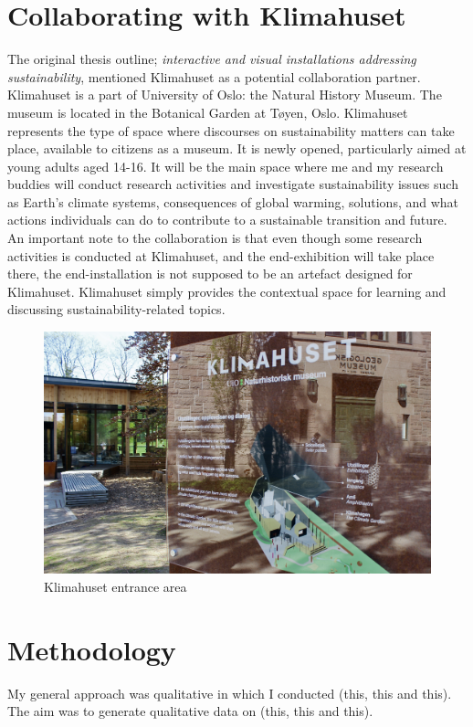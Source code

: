 \section{Collaborating with Klimahuset}
The original thesis outline; \emph{interactive and visual installations addressing sustainability}, mentioned Klimahuset as a potential collaboration partner. Klimahuset is a part of University of Oslo: the Natural History Museum. The museum is located in the Botanical Garden at Tøyen, Oslo. Klimahuset represents the type of space where discourses on sustainability matters can take place, available to citizens as a museum. It is newly opened, particularly aimed at young adults aged 14-16. It will be the main space where me and my research buddies will conduct research activities and investigate sustainability issues such as Earth’s climate systems, consequences of global warming, solutions, and what actions individuals can do to contribute to a sustainable transition and future. An important note to the collaboration is that even though some research activities is conducted at Klimahuset, and the end-exhibition will take place there, the end-installation is not supposed to be an artefact designed for Klimahuset. Klimahuset simply provides the contextual space for learning and discussing sustainability-related topics.

\begin{figure}[H]
\includegraphics[width=12cm]{pictures/klimahuset/klimahuset_info.JPG}
\caption{Klimahuset entrance area}
\centering 
\end{figure}


\section{Methodology}

My general approach was qualitative in which I conducted (this, this and this). The aim was to generate qualitative data on (this, this and this).

